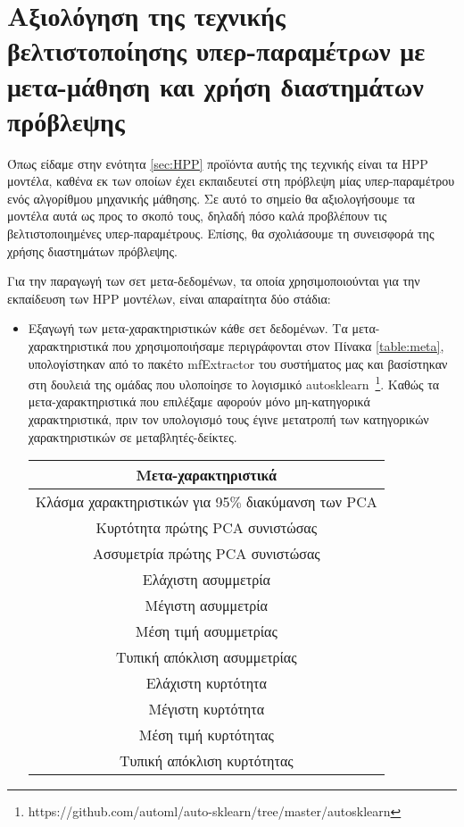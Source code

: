 \section{Αξιολόγηση της τεχνικής βελτιστοποίησης υπερ-παραμέτρων με μετα-μάθηση και χρήση διαστημάτων πρόβλεψης}
Όπως είδαμε στην ενότητα \ref{sec:HPP} προϊόντα αυτής της τεχνικής είναι τα HPP μοντέλα, καθένα εκ των οποίων έχει εκπαιδευτεί στη πρόβλεψη μίας υπερ-παραμέτρου ενός αλγορίθμου μηχανικής μάθησης. Σε αυτό το σημείο θα αξιολογήσουμε τα μοντέλα αυτά ως προς το σκοπό τους, δηλαδή πόσο καλά προβλέπουν τις βελτιστοποιημένες υπερ-παραμέτρους. Επίσης, θα σχολιάσουμε τη συνεισφορά της χρήσης διαστημάτων πρόβλεψης.

Για την παραγωγή των σετ μετα-δεδομένων, τα οποία χρησιμοποιούνται για την εκπαίδευση των HPP μοντέλων, είναι απαραίτητα δύο στάδια:
\begin{itemize}
	\item Εξαγωγή των μετα-χαρακτηριστικών κάθε σετ δεδομένων. Τα μετα-χαρακτηριστικά που χρησιμοποιήσαμε περιγράφονται στον Πίνακα \ref{table:meta}, υπολογίστηκαν από το πακέτο mf\-Extractor του συστήματος μας και βασίστηκαν στη δουλειά της ομάδας που υλοποίησε το λογισμικό autosklearn~\footnote{https://github.com/automl/auto-sklearn/tree/master/autosklearn}. Καθώς τα μετα-χαρακτηριστικά που επιλέξαμε αφορούν μόνο μη-κατηγορικά χαρακτηριστικά, πριν τον υπολογισμό τους έγινε μετατροπή των κατηγορικών χαρακτηριστικών σε μεταβλητές-δείκτες. 
	 \begin{table}[!htb]
	 	\begin{center}
	 		\begin{tabular}{ |c| } 
	 			\hline
	 			Μετα-χαρακτηριστικά\\
	 			\hline
	 			Κλάσμα χαρακτηριστικών για 95$\%$ διακύμανση των PCA \\ 
	 			Κυρτότητα πρώτης PCA συνιστώσας   \\ 
	 			Ασσυμετρία πρώτης PCA συνιστώσας   \\ 
	 			Ελάχιστη ασυμμετρία \\
	 			Μέγιστη ασυμμετρία \\
	 			Μέση τιμή ασυμμετρίας \\
	 			Τυπική απόκλιση ασυμμετρίας \\
	 			Ελάχιστη κυρτότητα \\
	 			Μέγιστη κυρτότητα \\
	 			Μέση τιμή κυρτότητας \\
	 			Τυπική απόκλιση κυρτότητας \\        	

\end{tabular}
\end{center}
\end{table}
\end{itemize}
